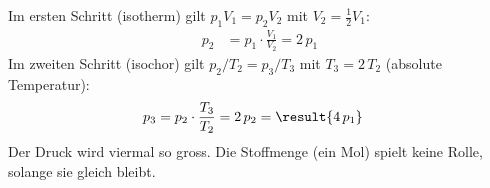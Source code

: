 Im ersten Schritt (isotherm) gilt $p_1V_1 = p_2V_2$ mit $V_2 = \frac{1}{2}V_1$:
\begin{align}
 p_2 &= p_1\cdot\frac{V_1}{V_2} = 2\,p_1
\end{align}
Im zweiten Schritt (isochor) gilt $p_2/T_2 = p_3/T_3$ mit $T_3 = 2\,T_2$ (absolute Temperatur):
\begin{align}
 p_3 &= p_2\cdot\frac{T_3}{T_2} = 2\,p_2 = \result{4\,p_1}
\end{align}
Der Druck wird viermal so gross. Die Stoffmenge (ein Mol) spielt keine Rolle, solange sie gleich bleibt.
